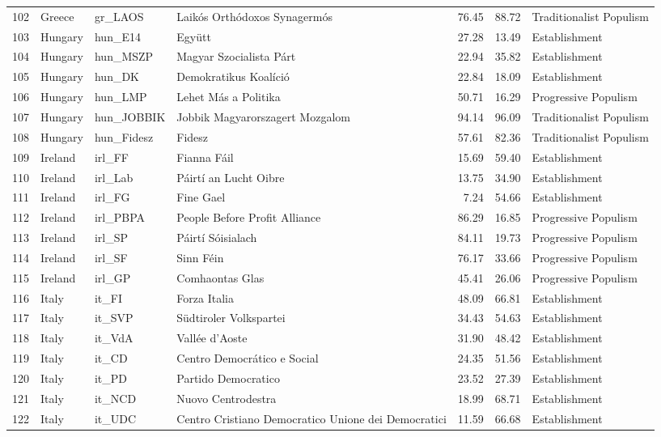\begin{longtable}[c]{@{\extracolsep{\fill}}rlllrrl}
		102 & Greece & gr\_LAOS & Laikós Orthódoxos Synagermós & 76.45 & 88.72 & Traditionalist Populism \\
		103 & Hungary & hun\_E14 & Együtt & 27.28 & 13.49 & Establishment \\
		104 & Hungary & hun\_MSZP & Magyar Szocialista Párt & 22.94 & 35.82 & Establishment \\
		105 & Hungary & hun\_DK & Demokratikus Koalíció & 22.84 & 18.09 & Establishment \\
		106 & Hungary & hun\_LMP & Lehet Más a Politika & 50.71 & 16.29 & Progressive Populism \\
		107 & Hungary & hun\_JOBBIK & Jobbik Magyarorszagert Mozgalom & 94.14 & 96.09 & Traditionalist Populism \\
		108 & Hungary & hun\_Fidesz & Fidesz & 57.61 & 82.36 & Traditionalist Populism \\
		109 & Ireland & irl\_FF & Fianna Fáil & 15.69 & 59.40 & Establishment \\
		110 & Ireland & irl\_Lab & Páirtí an Lucht Oibre & 13.75 & 34.90 & Establishment \\
		111 & Ireland & irl\_FG & Fine Gael & 7.24 & 54.66 & Establishment \\
		112 & Ireland & irl\_PBPA & People Before Profit Alliance & 86.29 & 16.85 & Progressive Populism \\
		113 & Ireland & irl\_SP & Páirtí Sóisialach & 84.11 & 19.73 & Progressive Populism \\
		114 & Ireland & irl\_SF & Sinn Féin & 76.17 & 33.66 & Progressive Populism \\
		115 & Ireland & irl\_GP & Comhaontas Glas & 45.41 & 26.06 & Progressive Populism \\
		116 & Italy & it\_FI & Forza Italia & 48.09 & 66.81 & Establishment \\
		117 & Italy & it\_SVP & Südtiroler Volkspartei & 34.43 & 54.63 & Establishment \\
		118 & Italy & it\_VdA & Vallée d'Aoste & 31.90 & 48.42 & Establishment \\
		119 & Italy & it\_CD & Centro Democrático e Social & 24.35 & 51.56 & Establishment \\
		120 & Italy & it\_PD & Partido Democratico & 23.52 & 27.39 & Establishment \\
		121 & Italy & it\_NCD & Nuovo Centrodestra & 18.99 & 68.71 & Establishment \\
		122 & Italy & it\_UDC & Centro Cristiano Democratico Unione dei Democratici & 11.59 & 66.68 & Establishment \\

\end{longtable}
